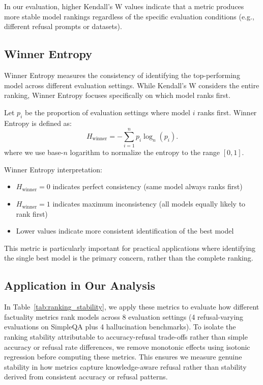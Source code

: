 \documentclass{article} %
\theoremstyle{definition}
\begin{document}
In our evaluation, higher Kendall's W values indicate that a metric produces more stable model rankings regardless of the specific evaluation conditions (e.g., different refusal prompts or datasets).

\subsection{Winner Entropy}

Winner Entropy measures the consistency of identifying the top-performing model across different evaluation settings. While Kendall's W considers the entire ranking, Winner Entropy focuses specifically on which model ranks first.

Let $p_i$ be the proportion of evaluation settings where model $i$ ranks first. Winner Entropy is defined as:
\[
H_{\text{winner}} = -\sum_{i=1}^{n} p_i \log_n(p_i).
\]
where we use base-$n$ logarithm to normalize the entropy to the range $[0, 1]$.

Winner Entropy interpretation:
\begin{itemize}
    \item $H_{\text{winner}} = 0$ indicates perfect consistency (same model always ranks first)
    \item $H_{\text{winner}} = 1$ indicates maximum inconsistency (all models equally likely to rank first)
    \item Lower values indicate more consistent identification of the best model
\end{itemize}

This metric is particularly important for practical applications where identifying the single best model is the primary concern, rather than the complete ranking.

\subsection{Application in Our Analysis}

In Table~\ref{tab:ranking_stability}, we apply these metrics to evaluate how different factuality metrics rank models across 8 evaluation settings (4 refusal-varying evaluations on SimpleQA plus 4 hallucination benchmarks). To isolate the ranking stability attributable to accuracy-refusal trade-offs rather than simple accuracy or refusal rate differences, we remove monotonic effects using isotonic regression before computing these metrics. This ensures we measure genuine stability in how metrics capture knowledge-aware refusal rather than stability derived from consistent accuracy or refusal patterns.
\end{document}
